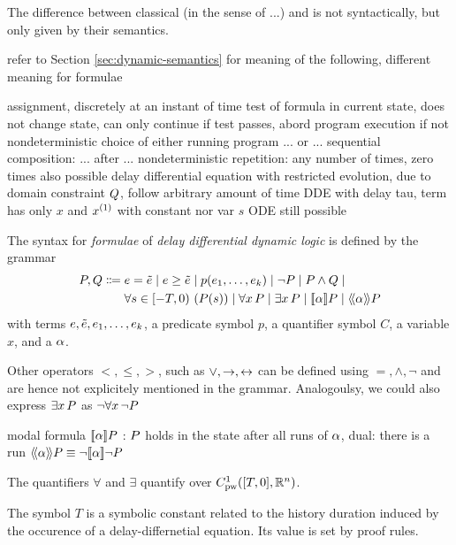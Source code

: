     The difference between classical \HPs (in the sense of ...) and \dHPs is not syntactically, but only given by their semantics.

    refer to Section \ref{sec:dynamic-semantics} for meaning of the following, different meaning for formulae

    assignment, discretely at an instant of time
    test of formula in current state, does not change state, can only continue if test passes, abord program execution if not
    nondeterministic choice of either running program ... or ...
    sequential composition: ... after ...
    nondeterministic repetition: any number of times, zero times also possible
    delay differential equation with restricted evolution, due to domain constraint $Q$, follow arbitrary amount of time
    DDE with delay tau, term has only $x$ and $\D{x}$ with constant nor var $s$
    ODE still possible


    \begin{definition}\label{def:syntax-formula}
        The syntax for \emph{formulae} of \emph{delay differential dynamic logic} is defined by the grammar
        \begin{align*}
            \asfml,\bsfml \Coloneqq{}& %
                \astrm = \bstrm \mid
                \astrm\geq\bstrm \mid
                p(\range{\istrm{1}}{\istrm{k}}) \mid
                \lnot\asfml \mid
                \asfml\land\bsfml \mid\\
                &\holdssince{-T}{\asfml(s)} \mid
                \lforall{x}{\asfml} \mid
                \lexists{x}{\asfml} \mid
                \dbox{\asprg}{\asfml} \mid
                \ddiamond{\asprg}{\asfml}
        \end{align*}
        with \ddL terms $e,\tilde{e},e_{1},\ldots,e_{k}$,
        a predicate symbol $p$, a quantifier symbol $C$, a variable $x$, and a \dHP $\alpha$.
        
        Other operators $<,\leq,>$, such as $\lor,\rightarrow,\leftrightarrow$ can be defined using $=,\land,\lnot$ and are hence not explicitely mentioned in the grammar.
        Analogoulsy, we could also express $\exists x{\,} P$ as $\lnot\forall x{\,} \lnot P$

        modal formula $\dbox{\asprg}{\asfml}$ : $P$ holds in the state after all runs of $\alpha$, dual: there is a run
        $\ddiamond{\asprg}{\asfml}\equiv\lnot\dbox{\asprg}{\lnot\asfml}$

        The quantifiers $\forall$ and $\exists$ quantify over $\statespace$.

        The symbol $T$ is a symbolic constant related to the history duration induced by the occurence of a delay-differnetial equation. Its value is set by proof rules.
    \end{definition}


